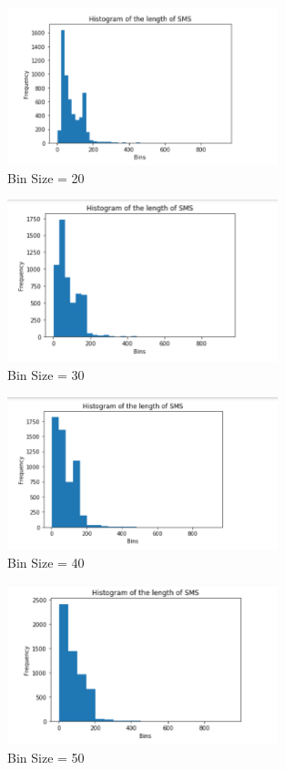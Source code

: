 \documentclass[12pt]{article}
\begin{document}
\begin{figure}[H] 
\centering 
\includegraphics[width=0.7\textwidth]{histogram3} 
\caption{Bin Size = 20}
\end{figure}

\begin{figure}[H] 
\centering 
\includegraphics[width=0.7\textwidth]{histogram4} 
\caption{Bin Size = 30}
\end{figure}

\begin{figure}[H] 
\centering 
\includegraphics[width=0.7\textwidth]{histogram5} 
\caption{Bin Size = 40}
\end{figure}

\begin{figure}[H] 
\centering 
\includegraphics[width=0.7\textwidth]{histogram6} 
\caption{Bin Size = 50}
\end{figure}
\end{document}
